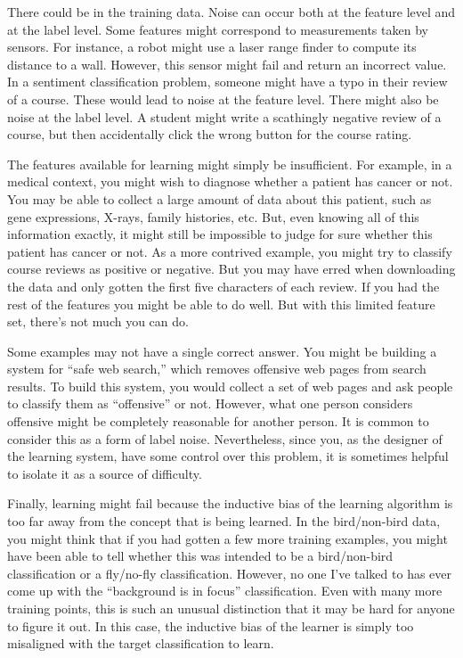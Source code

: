 There could be  in the training data.  Noise can occur
both at the feature level and at the label level.  Some features might
correspond to measurements taken by sensors.  For instance, a robot
might use a laser range finder to compute its distance to a wall.
However, this sensor might fail and return an incorrect value.  In a
sentiment classification problem, someone might have a typo in their
review of a course.  These would lead to noise at the feature level.
There might also be noise at the label level.  A student might write a
scathingly negative review of a course, but then accidentally click
the wrong button for the course rating.

The features available for learning might simply be insufficient.  For
example, in a medical context, you might wish to diagnose whether a
patient has cancer or not.  You may be able to collect a large amount
of data about this patient, such as gene expressions, X-rays, family
histories, etc.  But, even knowing all of this information exactly, it
might still be impossible to judge for sure whether this patient has
cancer or not.  As a more contrived example, you might try to classify
course reviews as positive or negative.  But you may have erred when
downloading the data and only gotten the first five characters of each
review.  If you had the rest of the features you might be able to do
well.  But with this limited feature set, there's not much you can do.

Some examples may not have a single correct answer.  You might be
building a system for ``safe web search,'' which removes offensive web
pages from search results.  To build this system, you would collect a
set of web pages and ask people to classify them as ``offensive'' or
not.  However, what one person considers offensive might be completely
reasonable for another person.  It is common to consider this as a
form of label noise.  Nevertheless, since you, as the designer of the
learning system, have some control over this problem, it is sometimes
helpful to isolate it as a source of difficulty.

Finally, learning might fail because the inductive bias of the
learning algorithm is too far away from the concept that is being
learned.  In the bird/non-bird data, you might think that if you had
gotten a few more training examples, you might have been able to tell
whether this was intended to be a bird/non-bird classification or a
fly/no-fly classification.  However, no one I've talked to has ever
come up with the ``background is in focus'' classification.  Even with
many more training points, this is such an unusual distinction that it
may be hard for anyone to figure it out.  In this case, the inductive
bias of the learner is simply too misaligned with the target
classification to learn.

